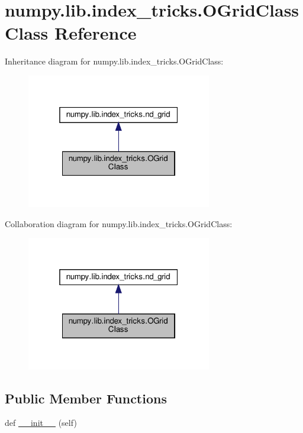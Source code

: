 \hypertarget{classnumpy_1_1lib_1_1index__tricks_1_1OGridClass}{}\section{numpy.\+lib.\+index\+\_\+tricks.\+O\+Grid\+Class Class Reference}
\label{classnumpy_1_1lib_1_1index__tricks_1_1OGridClass}


Inheritance diagram for numpy.\+lib.\+index\+\_\+tricks.\+O\+Grid\+Class\+:
\nopagebreak
\begin{figure}[H]
\begin{center}
\leavevmode
\includegraphics[width=229pt]{classnumpy_1_1lib_1_1index__tricks_1_1OGridClass__inherit__graph}
\end{center}
\end{figure}


Collaboration diagram for numpy.\+lib.\+index\+\_\+tricks.\+O\+Grid\+Class\+:
\nopagebreak
\begin{figure}[H]
\begin{center}
\leavevmode
\includegraphics[width=229pt]{classnumpy_1_1lib_1_1index__tricks_1_1OGridClass__coll__graph}
\end{center}
\end{figure}
\subsection*{Public Member Functions}
\begin{DoxyCompactItemize}
\item 
def \hyperlink{classnumpy_1_1lib_1_1index__tricks_1_1OGridClass_a600b1050de50f33c2fe60341f298f2eb}{\+\_\+\+\_\+init\+\_\+\+\_\+} (self)
\end{DoxyCompactItemize}
